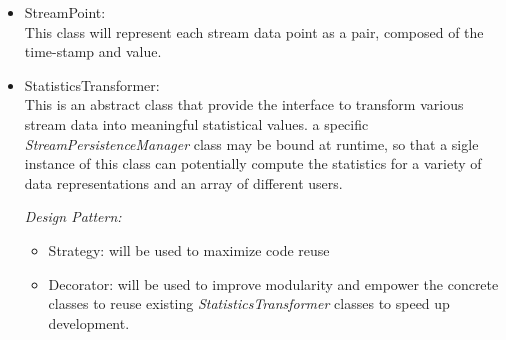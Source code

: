 \begin{itemize}
\item StreamPoint:\\
This class will represent each stream data point as a pair, composed of the time-stamp and value.


\item StatisticsTransformer:\\
This is an abstract class that provide the interface to transform various stream data into meaningful statistical values. a specific \textit{StreamPersistenceManager} class may be bound at runtime, so that a sigle instance of this class can potentially compute the statistics for a variety of data representations and an array of different users.

\emph{Design Pattern:}
\begin{itemize}
	\item Strategy: will be used to maximize code reuse
	\item Decorator: will be used to improve modularity and empower the concrete classes to reuse existing \textit{StatisticsTransformer} classes to speed up development.
\end{itemize}


\end{itemize}













